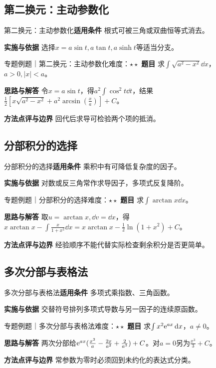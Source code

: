 \subsection{第二换元：主动参数化}\label{mat:integrals_methods:i04}
\begin{method}{第二换元：主动参数化}\textbf{适用条件} 根式可被三角或双曲恒等式消去。\par\textbf{实施与依据} 选择$x=a\sin t,a\tan t,a\sinh t$等适当分支。\end{method}
\begin{example}{专题例题｜第二换元：主动参数化}{难度：$\star\star$}
\textbf{题目} 求$\int\sqrt{a^2-x^2}\dd x$，$a>0,|x|<a$。\par\textbf{思路与解答} 令$x=a\sin t$，得$a^2\int\cos^2t\dd t$，结果$\frac12[x\sqrt{a^2-x^2}+a^2\arcsin(\frac{x}{a})]+C$。\par\textbf{方法点评与边界} 回代后求导可检验两个项的抵消。
\end{example}
\subsection{分部积分的选择}\label{mat:integrals_methods:i05}
\begin{method}{分部积分的选择}\textbf{适用条件} 乘积中有可降低复杂度的因子。\par\textbf{实施与依据} 对数或反三角常作求导因子，多项式反复降阶。\end{method}
\begin{example}{专题例题｜分部积分的选择}{难度：$\star\star$}
\textbf{题目} 求$\int\arctan x\dd x$。\par\textbf{思路与解答} 取$u=\arctan x,\dd v=\dd x$，得$x\arctan x-\int \frac{x}{1+x^2}\dd x=x\arctan x-\frac12\ln(1+x^2)+C$。\par\textbf{方法点评与边界} 经验顺序不能代替实际检查剩余积分是否更简单。
\end{example}
\subsection{多次分部与表格法}\label{mat:integrals_methods:i06}
\begin{method}{多次分部与表格法}\textbf{适用条件} 多项式乘指数、三角函数。\par\textbf{实施与依据} 交替符号排列多项式导数与另一因子的连续原函数。\end{method}
\begin{example}{专题例题｜多次分部与表格法}{难度：$\star\star$}
\textbf{题目} 求$\int x^2\mathrm{e}^{ax}\mathop{}\!\mathrm{d} x$，$a\ne0$。\par\textbf{思路与解答} 两次分部给$\mathrm{e}^{ax}(\frac{x^2}{a}-\frac{2x}{a^2}+\frac{2}{a^3})+C$。对$a=0$另为$\frac{x^3}{3}+C$。\par\textbf{方法点评与边界} 常参数为零时必须回到未约化的表达式分类。
\end{example}
